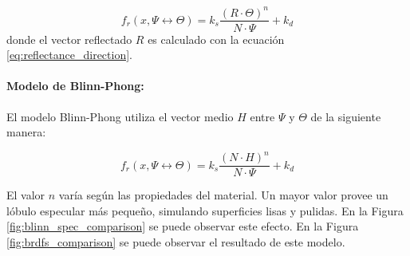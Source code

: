 \begin{equation}
    f_{r}(x, \Psi\leftrightarrow\Theta) = k_{s}\frac{(R\cdot \Theta)^n}{N\cdot\Psi} + k_{d}
    \label{eq:phong}
\end{equation} donde el vector reflectado $R$ es calculado con la ecuación \ref{eq:reflectance_direction}.

\paragraph{Modelo de Blinn-Phong:}
\label{para:blinn_phong}
El modelo Blinn-Phong utiliza el vector medio $H$ entre $\Psi$ y $\Theta$ de la siguiente manera:

\begin{equation}
    f_{r}(x, \Psi\leftrightarrow\Theta) = k_{s}\frac{(N\cdot H)^n}{N\cdot\Psi} + k_{d}
    \label{eq:blinn_phong_pr}
\end{equation}

El valor $n$ varía según las propiedades del material. Un mayor valor provee un lóbulo especular más pequeño, simulando superficies lisas y pulidas. En la Figura \ref{fig:blinn_spec_comparison} se puede observar este efecto. En la Figura \ref{fig:brdfs_comparison} se puede observar el resultado de este modelo.


